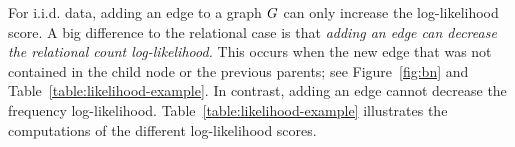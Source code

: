 \documentclass[letterpaper]{article}
\begin{document}
\begin{table}
\caption{Relational Local (Pseudo) Log-likelihood Scores.}
\begin{center}
\end{center}
\label{table:ll}
\end{table}%


For i.i.d. data, adding an edge to a graph $G$ can only increase the log-likelihood score. A big difference to the relational case is that {\em adding an edge can decrease the relational count log-likelihood.} This occurs when the new edge  that was not contained in the child node or the previous parents; see Figure~\ref{fig:bn} and Table~\ref{table:likelihood-example}. In contrast, adding an edge cannot decrease the frequency log-likelihood. Table~\ref{table:likelihood-example} illustrates the computations of the different log-likelihood scores.%

\end{document}
